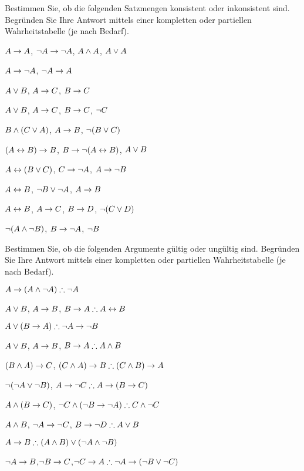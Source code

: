 \noindent\problempart
\label{pr.TT.satisfiable5}
Bestimmen Sie, ob die folgenden Satzmengen konsistent oder inkonsistent sind. Begründen Sie Ihre Antwort mittels einer kompletten oder partiellen Wahrheitstabelle (je nach Bedarf).
\begin{earg}
\item $A\rightarrow A$, $\neg A \rightarrow \neg A$, $A\wedge A$, $A\vee A$ %
\item $A \rightarrow \neg A$, $\neg A \rightarrow A$%
\item $A\vee B$, $A\rightarrow C$, $B\rightarrow C$ %
\item $A \vee B$, $A \rightarrow C$, $B \rightarrow C$, $\neg C$ %
\item $B\wedge(C\vee A)$, $A\rightarrow B$, $\neg(B\vee C)$  %
\item $(A \leftrightarrow B) \rightarrow B$,  $B \rightarrow \neg (A \leftrightarrow B)$, $A \vee B$  %
\item $A\leftrightarrow(B\vee C)$, $C\rightarrow \neg A$, $A\rightarrow \neg B$ %
\item  $A \leftrightarrow B$,  $\neg B \vee \neg A$,  $A \rightarrow  B$ %
\item $A \leftrightarrow B$, $A \rightarrow C$, $B \rightarrow D$, $\neg(C \vee D)$ %
\item $\neg (A \wedge \neg B)$,  $B \rightarrow \neg A$, $\neg B$   %
\end{earg}

\noindent\problempart Bestimmen Sie, ob die folgenden Argumente gültig oder ungültig sind. Begründen Sie Ihre Antwort mittels einer kompletten oder partiellen Wahrheitstabelle (je nach Bedarf).
\label{pr.TT.valid5} 
\begin{earg}
\item $A\eif(A\eand\enot A)\therefore \enot A$%
\item $A \vee B$, $A \rightarrow B$, $B \eif A \therefore  A \eiff B$  %
\item $A\eor(B\eif A)\therefore \enot A \eif \enot B$ %
\item $A \vee B$, $A \rightarrow B$, $ B \eif A \therefore  A \eand B$ %
\item $(B\wedge A)\rightarrow C$, $(C\eand A)\eif B\therefore (C\eand B)\eif A$ %
\item $\neg (\neg A \vee \neg B)$, $A \eif \enot C \therefore  A \eif (B \eif C)$ %
\item $A \wedge (B \rightarrow C)$, $\enot C \eand (\enot B \eif \enot A)\therefore C \eand \enot C$ %
\item $A \wedge B$, $\neg A \rightarrow \neg C$, $B \eif \enot D \therefore  A \eor B$ %
\item $A \eif B\therefore (A \eand B) \eor (\enot A \eand \enot B)$ %
\item $\neg A \rightarrow B$,$ \neg B \rightarrow C $,$ \enot C \eif A \therefore  \enot A \eif (\enot B \eor \enot C) $%

\end{earg}

